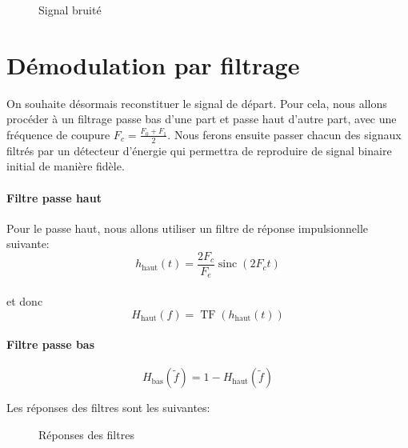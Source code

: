 \documentclass{article}
\newcommand{\TF}{\operatorname{TF}}
\newcommand{\TF}{\operatorname{TF}}
\newcommand{\sinc}{\operatorname{sinc}}
\begin{document}
\begin{figure}[H]
	\centering
	
	\caption{Signal bruité}
	\label{fig:bruite}
\end{figure}

\section{Démodulation par filtrage}

On souhaite désormais reconstituer le signal de départ. Pour cela, nous allons procéder à un filtrage passe bas d'une part et passe haut d'autre part, avec une fréquence de coupure $F_c=\frac{F_0+F_1}{2}$. Nous ferons ensuite passer chacun des signaux filtrés par un détecteur d'énergie qui permettra de reproduire de signal binaire initial de manière fidèle.

\paragraph{Filtre passe haut}
Pour le passe haut, nous allons utiliser un filtre de réponse impulsionnelle suivante:
\[
h_\text{haut}(t) = \frac{2 F_c}{F_e} \sinc(2 F_c t)
\]
\\
et donc \[H_\text{haut}(f) = \TF(h_\text{haut}(t))
\]

\paragraph{Filtre passe bas}

\[
	H_\text{bas}(\tilde{f}) = 1-H_\text{haut}(\tilde{f})
\]

Les réponses des filtres sont les suivantes:

\begin{figure}[H]
	\centering
	\begin{minipage}{0.45\textwidth}
		\scalebox{0.5}{
		
	}
	\end{minipage}\hfill
	\begin{minipage}{0.45\textwidth}
		\scalebox{0.5}{
		
	}
	\end{minipage}
	\begin{minipage}{0.45\textwidth}
		\scalebox{0.5}{
		
	}
	\end{minipage}\hfill
	\begin{minipage}{0.45\textwidth}
		\scalebox{0.5}{
		
	}
	\end{minipage}
	\caption{Réponses des filtres}
	\label{fig:reponses-filtres}
\end{figure}
\end{document}
